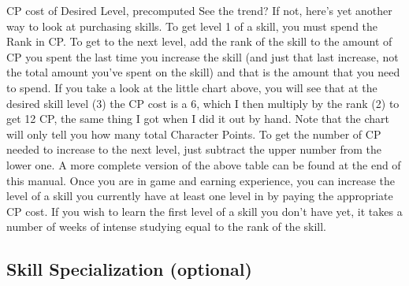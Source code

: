 \documentclass[twoside]{book}
\begin{document}
              
            CP cost of Desired Level, precomputed  
           See the trend?  If not, here’s yet another way to look at
             purchasing skills.  To get level 1 of a skill, you must spend the Rank in
             CP. To get to the next level, add the rank of the skill to
             the amount of CP you spent the last time you increase the
             skill (and just that last increase, not the total amount
             you’ve spent on the skill) and that is the amount that
             you need to spend. 
   If you take a look at the little chart above, you will
             see that at the desired skill level (3) the CP cost is a 6,
             which I then multiply by the rank (2) to get 12 CP, the same
             thing I got when I did it out by hand.  Note that the chart will only tell you how many total
             Character Points. To get the number of CP needed to increase
             to the next level, just subtract the upper number from the
             lower one. A more complete version of the above table can be
             found at the end of this manual.  Once you are in game and earning experience, you can
             increase the level of a skill you currently have at least
             one level in by paying the appropriate CP cost. If you wish
             to learn the first level of a skill you don’t have
             yet, it takes a number of weeks of intense studying equal to
             the rank of the skill. 
\subsection{Skill Specialization (optional)}
    
\end{document}
